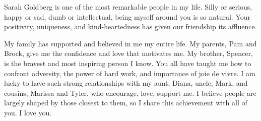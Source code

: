 Sarah Goldberg is one of the most remarkable people in my life.  Silly or serious, happy or sad, dumb or intellectual,
being myself around you is so natural.  Your positivity, uniqueness, and kind-heartedness has given our friendship its affluence.

My family has supported and believed in me my entire life.  My parents, Pam and Brock, give me the
confidence and love that motivates me.  My brother, Spencer, is the bravest and most inspiring person I know.  You all have taught me how to
confront adversity, the power of hard work, and importance of joie de vivre.  I am lucky to have such strong relationships with my aunt,
Diana, uncle, Mark, and cousins, Marissa and Tyler, who encourage, love, support me.  I believe people are largely shaped by those closest to
them, so I share this achievement with all of you.  I love you.
